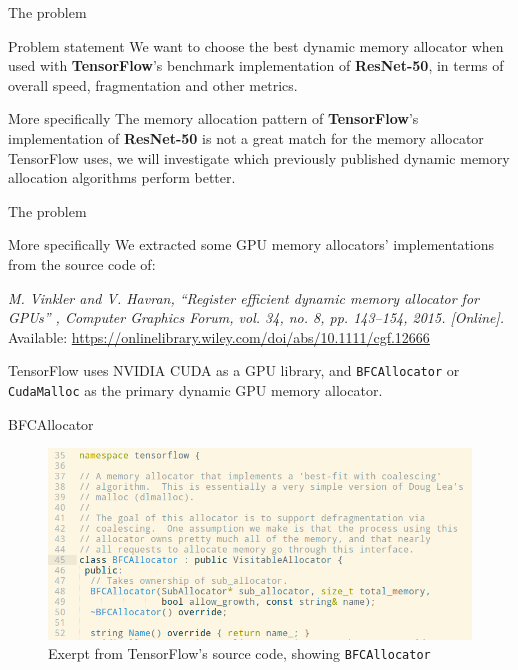 \documentclass[10pt]{beamer}
\begin{document}
\begin{frame}[fragile]{The problem}


\begin{alertblock}{Problem statement}
 We want to choose the best dynamic memory allocator when used with \textbf{TensorFlow}'s benchmark implementation of \textbf{ResNet-50}, in terms of overall speed, fragmentation and other metrics.
\end{alertblock}

\begin{exampleblock}{More specifically}
 The memory allocation pattern of \textbf{TensorFlow}'s implementation of \textbf{ResNet-50} is not a great match for the memory allocator TensorFlow uses, we will investigate which previously published dynamic memory allocation algorithms perform better.
\end{exampleblock}

\end{frame}

\begin{frame}[fragile]{The problem}


\begin{exampleblock}{More specifically}
We extracted some GPU memory allocators' implementations from the source code of:

\textit{M. Vinkler and V. Havran, “Register efficient dynamic memory allocator for GPUs” , Computer Graphics Forum, vol. 34, no. 8, pp. 143–154, 2015. [Online].} Available: \url{https://onlinelibrary.wiley.com/doi/abs/10.1111/cgf.12666}

TensorFlow uses NVIDIA CUDA as a GPU library, and \texttt{BFCAllocator} or \texttt{CudaMalloc} as the primary dynamic GPU memory allocator.
\end{exampleblock}
\end{frame}

\begin{frame}[fragile]{BFCAllocator}
 \begin{figure}
 \includegraphics[scale=0.4]{images/BFCAllocator.png}
 \caption{Exerpt from TensorFlow's source code, showing \texttt{BFCAllocator}}
 \end{figure}
\end{frame}
\end{document}

